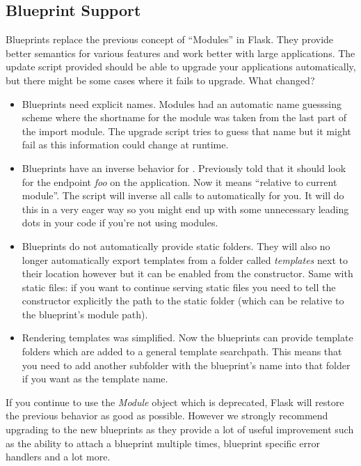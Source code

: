 \documentclass[a4paper,12pt]{sphinxmanual}
\begin{document}
\subsection{Blueprint Support}
\label{upgrading:blueprint-support}
Blueprints replace the previous concept of “Modules” in Flask.  They
provide better semantics for various features and work better with large
applications.  The update script provided should be able to upgrade your
applications automatically, but there might be some cases where it fails
to upgrade.  What changed?
\begin{itemize}
\item {} 
Blueprints need explicit names.  Modules had an automatic name
guesssing scheme where the shortname for the module was taken from the
last part of the import module.  The upgrade script tries to guess
that name but it might fail as this information could change at
runtime.

\item {} 
Blueprints have an inverse behavior for .  Previously
 told  that it should look for the endpoint
\emph{foo} on the application.  Now it means “relative to current module”.
The script will inverse all calls to  automatically for
you.  It will do this in a very eager way so you might end up with
some unnecessary leading dots in your code if you're not using
modules.

\item {} 
Blueprints do not automatically provide static folders.  They will
also no longer automatically export templates from a folder called
\emph{templates} next to their location however but it can be enabled from
the constructor.  Same with static files: if you want to continue
serving static files you need to tell the constructor explicitly the
path to the static folder (which can be relative to the blueprint's
module path).

\item {} 
Rendering templates was simplified.  Now the blueprints can provide
template folders which are added to a general template searchpath.
This means that you need to add another subfolder with the blueprint's
name into that folder if you want  as
the template name.

\end{itemize}

If you continue to use the \emph{Module} object which is deprecated, Flask will
restore the previous behavior as good as possible.  However we strongly
recommend upgrading to the new blueprints as they provide a lot of useful
improvement such as the ability to attach a blueprint multiple times,
blueprint specific error handlers and a lot more.
\end{document}

